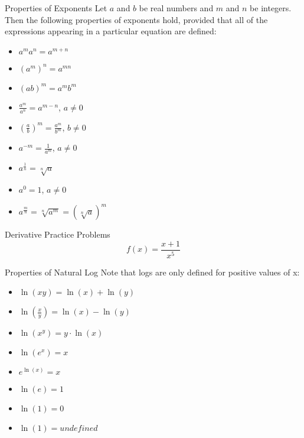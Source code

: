 \documentclass[aspectratio=169]{beamer}
\begin{document}
\begin{frame}{Properties of Exponents}\label{main1}
Let $a$ and $b$ be real numbers and $m$ and $n$ be integers. Then the following properties of exponents hold, provided that all of the expressions appearing in a particular equation are defined:
\begin{itemize}
\begin{itemize}
    \item $a^m a^n = a^{m+n}$
    \item $(a^m)^n = a^{mn}$
    \item $(ab)^m = a^m b^m$
    \item $\frac{a^m}{a^n} = a^{m-n}$, $a \neq 0$
    \item $\left(\frac{a}{b}\right)^m = \frac{a^m}{b^m}$, $b \neq 0$
    \item $a^{-m} = \frac{1}{a^m}$, $a \neq 0$
    \item $a^{\frac{1}{n}} = \sqrt[n]{a}$
    \item $a^0 = 1$, $a \neq 0$
    \item $a^{\frac{m}{n}} = \sqrt[n]{a^m} = \left(\sqrt[n]{a}\right)^m$
\end{itemize}
\end{itemize}
\end{frame}

\begin{frame}{Derivative Practice Problems}\label{main1}
	\vspace{-4cm}
    \[
    f(x) = \frac{x + 1}{x^{5}}
    \]
\end{frame}

\begin{frame}{Properties of Natural Log}\label{main1}
Note that logs are only defined for positive values of x:
\begin{itemize}
\begin{itemize}
    \item $\ln(xy) = \ln(x) + \ln(y)$
    \item $\ln\left(\frac{x}{y}\right) = \ln(x) - \ln(y)$
    \item $\ln(x^y) = y \cdot \ln(x)$
    \item $\ln(e^x) = x$
    \item $e^{\ln(x)} = x$
    \item $\ln(e) = 1$
    \item $\ln(1) = 0$
    \item $\ln(1) = undefined$
\end{itemize}
\end{itemize}
\end{frame}
\end{document}
